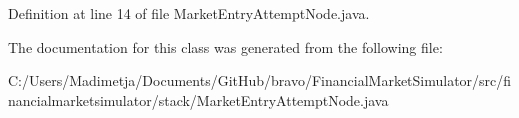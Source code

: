 Definition at line 14 of file Market\+Entry\+Attempt\+Node.\+java.



The documentation for this class was generated from the following file\+:\begin{DoxyCompactItemize}
\item 
C\+:/\+Users/\+Madimetja/\+Documents/\+Git\+Hub/bravo/\+Financial\+Market\+Simulator/src/financialmarketsimulator/stack/Market\+Entry\+Attempt\+Node.\+java\end{DoxyCompactItemize}

